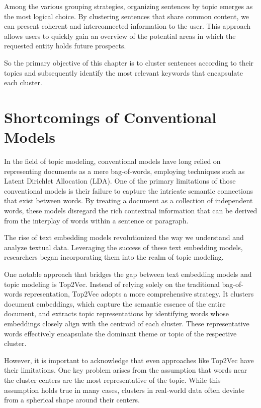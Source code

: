 \documentclass[a4paper,10pt]{report} %
\begin{document}
Among the various grouping strategies, organizing sentences by topic emerges as the most logical choice. By clustering sentences that share common content, we can present coherent and interconnected information to the user. This approach allows users to quickly gain an overview of the potential areas in which the requested entity holds future prospects.

So the primary objective of this chapter is to cluster sentences according to their topics and subsequently identify the most relevant keywords that encapsulate each cluster.

\section{Shortcomings of Conventional Models}
In the field of topic modeling, conventional models have long relied on representing documents as a mere bag-of-words, employing techniques such as Latent Dirichlet Allocation (LDA). One of the primary limitations of those conventional models is their failure to capture the intricate semantic connections that exist between words. By treating a document as a collection of independent words, these models disregard the rich contextual information that can be derived from the interplay of words within a sentence or paragraph.

The rise of text embedding models revolutionized the way we understand and analyze textual data. Leveraging the success of these text embedding models, researchers began incorporating them into the realm of topic modeling.

One notable approach that bridges the gap between text embedding models and topic modeling is Top2Vec. Instead of relying solely on the traditional bag-of-words representation, Top2Vec adopts a more comprehensive strategy. It clusters document embeddings, which capture the semantic essence of the entire document, and extracts topic representations by identifying words whose embeddings closely align with the centroid of each cluster. These representative words effectively encapsulate the dominant theme or topic of the respective cluster.

However, it is important to acknowledge that even approaches like Top2Vec have their limitations. One key problem arises from the assumption that words near the cluster centers are the most representative of the topic. While this assumption holds true in many cases, clusters in real-world data often deviate from a spherical shape around their centers.
\end{document}
